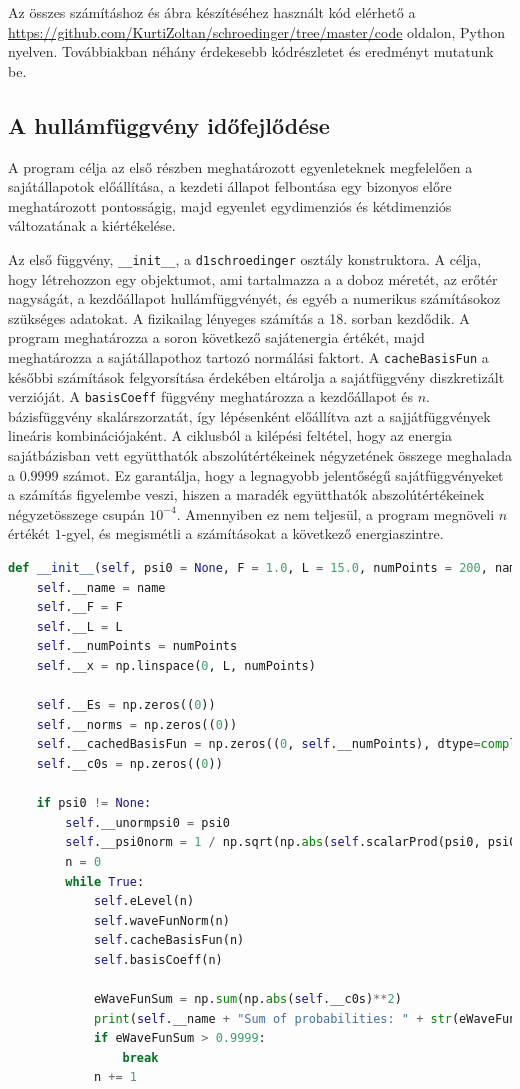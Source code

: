 Az összes számításhoz és ábra készítéséhez használt kód elérhető a \url{https://github.com/KurtiZoltan/schroedinger/tree/master/code} oldalon, Python nyelven. Továbbiakban néhány érdekesebb kódrészletet és eredményt mutatunk be.
\subsection{A hullámfüggvény időfejlődése}
A program célja az első részben meghatározott egyenleteknek megfelelően a sajátállapotok előállítása, a kezdeti állapot felbontása egy bizonyos előre meghatározott pontosságig, majd  egyenlet egydimenziós és kétdimenziós változatának a kiértékelése.

Az első függvény, \texttt{__init__}, a \texttt{d1schroedinger} osztály konstruktora. A célja, hogy létrehozzon egy objektumot, ami tartalmazza a a doboz méretét, az erőtér nagyságát, a kezdőállapot hullámfüggvényét, és egyéb a numerikus számításokoz szükséges adatokat. A fizikailag lényeges számítás a 18. sorban kezdődik. A program meghatározza a soron következő sajátenergia értékét, majd meghatározza a sajátállapothoz tartozó normálási faktort. A \texttt{cacheBasisFun} a későbbi számítások felgyorsítása érdekében eltárolja a sajátfüggvény diszkretizált verzióját. A \texttt{basisCoeff} függvény meghatározza a kezdőállapot és $n$. bázisfüggvény skalárszorzatát, így lépésenként előállítva azt a sajjátfüggvények lineáris kombinációjaként. A ciklusból a kilépési feltétel, hogy az energia sajátbázisban vett együtthatók abszolútértékeinek négyzetének összege meghalada a $0.9999$ számot. Ez garantálja, hogy a legnagyobb jelentőségű sajátfüggvényeket a számítás figyelembe veszi, hiszen a maradék együtthatók abszolútértékeinek négyzetösszege csupán $10^{-4}$. Amennyiben ez nem teljesül, a program megnöveli $n$ értékét $1$-gyel, és megismétli a számításokat a következő energiaszintre.
\begin{lstlisting}[language=Python]
def __init__(self, psi0 = None, F = 1.0, L = 15.0, numPoints = 200, name = "1D: "):
    self.__name = name
    self.__F = F
    self.__L = L
    self.__numPoints = numPoints
    self.__x = np.linspace(0, L, numPoints)
    
    self.__Es = np.zeros((0))
    self.__norms = np.zeros((0))
    self.__cachedBasisFun = np.zeros((0, self.__numPoints), dtype=complex)
    self.__c0s = np.zeros((0))
    
    if psi0 != None:
        self.__unormpsi0 = psi0
        self.__psi0norm = 1 / np.sqrt(np.abs(self.scalarProd(psi0, psi0)))
        n = 0
        while True:
            self.eLevel(n)
            self.waveFunNorm(n)
            self.cacheBasisFun(n)
            self.basisCoeff(n)
            
            eWaveFunSum = np.sum(np.abs(self.__c0s)**2)
            print(self.__name + "Sum of probabilities: " + str(eWaveFunSum))
            if eWaveFunSum > 0.9999:
                break
            n += 1
\end{lstlisting}
